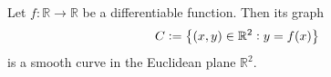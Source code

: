 \documentclass[11pt,openany]{article}
\begin{document}
%		
%		
%			
%			
\vfill\noindent
Let \(f : \mathbb{R} \to \mathbb{R}\) be a differentiable function. Then its graph
\[
C := \set[1]{ (x, y) \in \mathbb{R}^2 : y=f(x)}
\] is a smooth curve in the Euclidean plane \(\mathbb{R}^2\).
\end{document}
